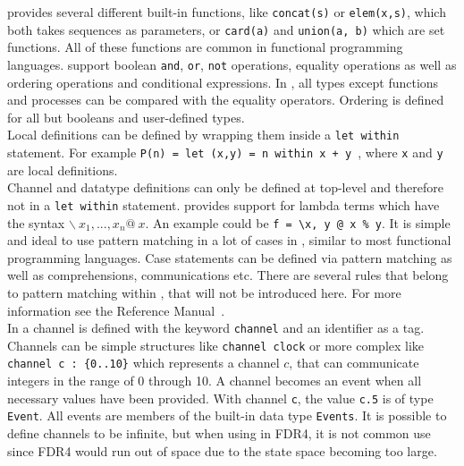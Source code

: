 \cspm{} provides several different built-in functions, like \texttt{concat(s)} or \texttt{elem(x,s)}, which both takes sequences as parameters, or \texttt{card(a)} and \texttt{union(a, b)} which are set functions. All of these functions are common in functional programming languages. \cspm{} support boolean \texttt{and}, \texttt{or}, \texttt{not} operations, equality operations as well as ordering operations and conditional expressions. In \cspm, all types except functions and processes can be compared with the equality operators. Ordering is defined for all but booleans and user-defined types. \\

Local definitions can be defined by wrapping them inside a \texttt{let within} statement. For example \texttt{P(n) = let (x,y) = n within x + y }, where \texttt{x} and \texttt{y} are local definitions.\\ Channel and datatype definitions can only be defined at top-level and therefore not in a \texttt{let within} statement.
\cspm{} provides support for lambda terms which have the syntax $\backslash \  x_1,...,x_n @\ x$. An example could be \texttt{f = \textbackslash x, y @ x \% y}.
It is simple and ideal to use pattern matching in a lot of cases in \cspm, similar to most functional programming languages. Case statements can be defined via pattern matching as well as comprehensions, communications etc. There are several rules that belong to pattern matching within \cspm{}, that will not be introduced here. For more information see the \cspm{} Reference Manual~\cite{Scattergood2011}.\\

In \cspm{} a channel is defined with the keyword \texttt{channel} and an identifier as a tag. Channels can be simple structures like \texttt{channel clock} or more complex like \texttt{channel c : \{0..10\}} which represents a channel $c$, that can communicate integers in the range of 0 through 10. A channel becomes an event when all necessary values have been provided. With channel \texttt{c}, the value \texttt{c.5} is of type \texttt{Event}. All events are members of the built-in data type \texttt{Events}. It is possible to define channels to be infinite, but when using \cspm{} in FDR4, it is not common use since FDR4 would run out of space due to the state space becoming too large.
